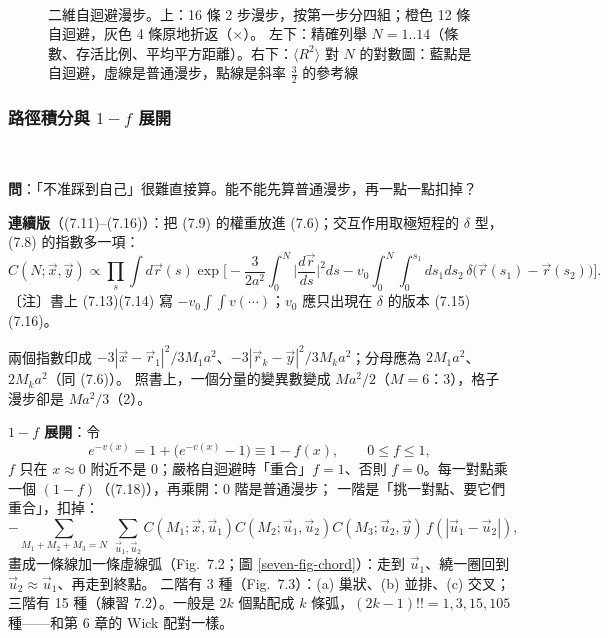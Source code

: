 \begin{figure}[htbp]
\centering
\SevenFigTwoStep\\[6pt]
\begin{minipage}[c]{0.6\linewidth}\centering\footnotesize\setlength{\tabcolsep}{2.5pt}\SevenTabSaw\end{minipage}\hfill
\begin{minipage}[c]{0.38\linewidth}\centering\SevenFigLogLog\end{minipage}
\caption{二維自迴避漫步。上：16 條 2 步漫步，按第一步分四組；橙色 12 條自迴避，灰色 4 條原地折返（$\times$）。
左下：精確列舉 $N=1..14$（條數、存活比例、平均平方距離）。右下：$\langle R^2\rangle$ 對 $N$ 的對數圖：藍點是自迴避，虛線是普通漫步，點線是斜率 $\frac32$ 的參考線}\label{seven-fig-saw}
\end{figure}

\subsubsection{路徑積分與 \texorpdfstring{$1-f$}{1-f} 展開}
\leavevmode{}\ \par\nopagebreak

\textbf{問}：「不准踩到自己」很難直接算。能不能先算普通漫步，再一點一點扣掉？

\textbf{連續版}（(7.11)--(7.16)）：把 (7.9) 的權重放進 (7.6)；交互作用取極短程的 $\delta$ 型，(7.8) 的指數多一項：
\[C(N;\vec x,\vec y)\propto\prod_s\int d\vec r(s)\exp\Big[-\frac{3}{2a^2}\int_0^N\Big|\frac{d\vec r}{ds}\Big|^2ds-v_0\int_0^N\!\!\int_0^{s_1}ds_1ds_2\,\delta\big(\vec r(s_1)-\vec r(s_2)\big)\Big].\tag{7.16}\]
〔注〕書上 (7.13)(7.14) 寫 $-v_0\int\!\!\int v(\cdots)$；$v_0$ 應只出現在 $\delta$ 的版本 (7.15)(7.16)。
\begin{errbox}[p.~173，(7.11)]
兩個指數印成 $-3|\vec x-\vec r_1|^2/3M_1a^2$、$-3|\vec r_k-\vec y|^2/3M_ka^2$；分母應為 $2M_1a^2$、$2M_ka^2$（同 (7.6)）。
照書上，一個分量的變異數變成 $Ma^2/2$（$M=6$：3），格子漫步卻是 $Ma^2/3$（2）。
\end{errbox}

\textbf{$1-f$ 展開}：令
\[e^{-v(x)}=1+\big(e^{-v(x)}-1\big)\equiv1-f(x),\qquad0\le f\le1,\tag{7.17}\]
$f$ 只在 $x\approx0$ 附近不是 0；嚴格自迴避時「重合」$f=1$、否則 $f=0$。每一對點乘一個 $(1-f)$（(7.18)），再乘開：0 階是普通漫步；
一階是「挑一對點、要它們重合」，扣掉：
\[-\sum_{M_1+M_2+M_3=N}\ \sum_{\vec u_1,\vec u_2}C(M_1;\vec x,\vec u_1)C(M_2;\vec u_1,\vec u_2)C(M_3;\vec u_2,\vec y)\,f(|\vec u_1-\vec u_2|),\tag{7.19}\]
畫成一條線加一條虛線弧（Fig.~7.2；圖 \ref{seven-fig-chord}）：走到 $\vec u_1$、繞一圈回到 $\vec u_2\approx\vec u_1$、再走到終點。
二階有 3 種（Fig.~7.3）：(a) 巢狀、(b) 並排、(c) 交叉；三階有 15 種（練習 7.2）。一般是 $2k$ 個點配成 $k$ 條弧，$(2k-1)!!=1,3,15,105$ 種——和第 6 章的 Wick 配對一樣。

